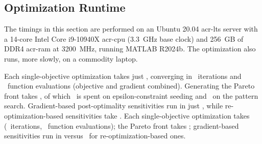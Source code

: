 \subsection{Optimization Runtime}
The timings in this section are performed on an Ubuntu 20.04 \gls{acr-lts} server with a 14-core Intel Core i9-10940X \gls{acr-cpu} (3.3~GHz base clock) and 256~GB of DDR4 \gls{acr-ram} at 3200~MHz, running MATLAB R2024b.
The optimization also runs, more slowly, on a commodity laptop.



\ifdefined\DISSERTATION
    Each single-objective optimization takes just \resultsRE[singleObjRuntime], converging in \resultsRE[singleObjIters]~iterations and \resultsRE[singleObjFcnEvals]~function evaluations (objective and gradient combined).
    Generating the Pareto front takes \resultsRE[paretoRuntime], of which \resultsRE[paretoPctTimeSeeds]~is spent on epsilon-constraint seeding and \resultsRE[paretoPctTimePatternSearch]~on the pattern search.
    Gradient-based post-optimality sensitivities run in just \resultsRE[gradientSensRuntime], while re-optimization-based sensitivities take \resultsRE[reoptimSensRuntime].
\else
    Each single-objective optimization takes \resultsRE[singleObjRuntime] (\resultsRE[singleObjIters]~iterations, \resultsRE[singleObjFcnEvals]~function evaluations); the Pareto front takes \resultsRE[paretoRuntime]; gradient-based sensitivities run in \resultsRE[gradientSensRuntime] versus \resultsRE[reoptimSensRuntime]~for re-optimization-based ones.
\fi
